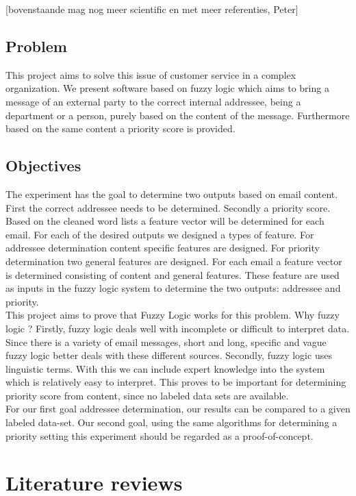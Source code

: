 \documentclass[journal]{IEEEtran}
\begin{document}
[bovenstaande mag nog meer scientific en met meer referenties, Peter]

\subsection{Problem}

This project aims to solve this issue of customer service in a complex organization. We present software based on fuzzy logic which aims to bring a message of an external party to the correct internal addressee, being a department or a person, purely based on the content of the message. Furthermore based on the same content a priority score is provided.

\subsection{Objectives}

The experiment has the goal to determine two outputs based on email content. First the correct addressee needs to be determined. Secondly a priority score. Based on the cleaned word lists a feature vector will be determined for each email. For each of the desired outputs we designed a types of feature. For addressee determination content specific features are designed. For priority determination two general features are designed. For each email a feature vector is determined consisting of content and general features. These feature are used as inputs in the fuzzy logic system to determine the two outputs: addressee and priority. \\

This project aims to prove that Fuzzy Logic works for this problem. Why fuzzy logic ? Firstly, fuzzy logic deals well with incomplete or difficult to interpret data. Since there is a variety of email messages, short and long, specific and vague fuzzy logic better deals with these different sources. Secondly, fuzzy logic uses linguistic terms. With this we can include expert knowledge into the system which is relatively easy to interpret. This proves to be important for determining priority score from content, since no labeled data sets are available. \\

For our first goal addressee determination, our results can be compared to a given labeled data-set. Our second goal, using the same algorithms for determining a priority setting this experiment should be regarded as a proof-of-concept.  

\section{Literature reviews}
\end{document}
